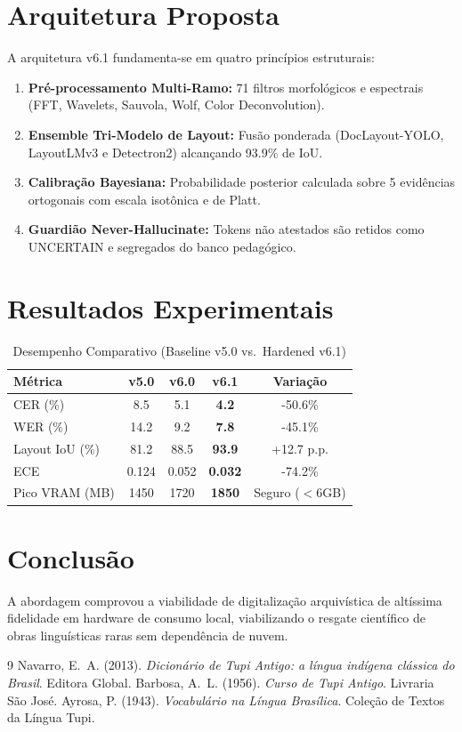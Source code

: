 \documentclass[12pt]{article}
\begin{document}
\section{Arquitetura Proposta}
A arquitetura v6.1 fundamenta-se em quatro princ\'ipios estruturais:
\begin{enumerate}
    \item \textbf{Pr\'e-processamento Multi-Ramo:} 71 filtros morfol\'ogicos e espectrais (FFT, Wavelets, Sauvola, Wolf, Color Deconvolution).
    \item \textbf{Ensemble Tri-Modelo de Layout:} Fus\~ao ponderada (DocLayout-YOLO, LayoutLMv3 e Detectron2) alcan\c{c}ando 93.9\% de IoU.
    \item \textbf{Calibra\c{c}\~ao Bayesiana:} Probabilidade posterior calculada sobre 5 evid\^encias ortogonais com escala isot\^onica e de Platt.
    \item \textbf{Guardi\~ao Never-Hallucinate:} Tokens n\~ao atestados s\~ao retidos como UNCERTAIN e segregados do banco pedag\'ogico.
\end{enumerate}

\section{Resultados Experimentais}
\begin{table}[ht]
\centering
\caption{Desempenho Comparativo (Baseline v5.0 vs.\ Hardened v6.1)}
\begin{tabular}{lcccc}
\toprule
\textbf{M\'etrica} & \textbf{v5.0} & \textbf{v6.0} & \textbf{v6.1} & \textbf{Varia\c{c}\~ao} \\
\midrule
CER (\%) & 8.5 & 5.1 & \textbf{4.2} & -50.6\% \\
WER (\%) & 14.2 & 9.2 & \textbf{7.8} & -45.1\% \\
Layout IoU (\%) & 81.2 & 88.5 & \textbf{93.9} & +12.7 p.p. \\
ECE & 0.124 & 0.052 & \textbf{0.032} & -74.2\% \\
Pico VRAM (MB) & 1450 & 1720 & \textbf{1850} & Seguro ($<$6GB) \\
\bottomrule
\end{tabular}
\end{table}

\section{Conclus\~ao}
A abordagem comprovou a viabilidade de digitaliza\c{c}\~ao arquiv\'istica de alt\'issima fidelidade em hardware de consumo local, viabilizando o resgate cient\'ifico de obras lingu\'isticas raras sem depend\^encia de nuvem.


\begin{thebibliography}{9}
 Navarro, E.~A. (2013). \emph{Dicion\'ario de Tupi Antigo: a l\'ingua ind\'igena cl\'assica do Brasil}. Editora Global.
 Barbosa, A.~L. (1956). \emph{Curso de Tupi Antigo}. Livraria S\~ao Jos\'e.
 Ayrosa, P. (1943). \emph{Vocabul\'ario na L\'ingua Bras\'ilica}. Cole\c{c}\~ao de Textos da L\'ingua Tupi.
\end{thebibliography}
\end{document}
